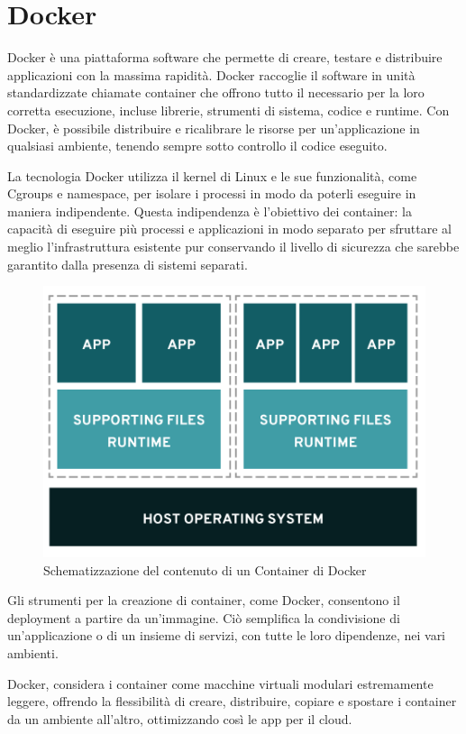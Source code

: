 \section{Docker}
Docker è una piattaforma software che permette di creare, testare e distribuire applicazioni con la massima rapidità. Docker raccoglie 
il software in unità standardizzate chiamate container che offrono tutto il necessario per la loro corretta esecuzione, incluse librerie, 
strumenti di sistema, codice e runtime. Con Docker, è possibile 
distribuire e ricalibrare le risorse per un'applicazione in qualsiasi ambiente, tenendo sempre sotto controllo il codice eseguito.

La tecnologia Docker utilizza il kernel di Linux e le sue funzionalità, come Cgroups e namespace, per isolare i processi in modo da poterli 
eseguire in maniera indipendente. Questa indipendenza è l'obiettivo dei container: la capacità di eseguire più processi e applicazioni in 
modo separato per sfruttare al meglio l'infrastruttura esistente pur conservando il livello di sicurezza che sarebbe garantito dalla 
presenza di sistemi separati.

\begin{figure}
	\centering
	\includegraphics[scale=0.7]{images/Docker_Config_Container.png}
	\caption{Schematizzazione del contenuto di un Container di Docker}
	\label{fig:DCC}
\end{figure}

Gli strumenti per la creazione di container, come Docker, consentono il deployment a partire da un'immagine. Ciò semplifica la 
condivisione di un'applicazione o di un insieme di servizi, con tutte le loro dipendenze, nei vari ambienti.

Docker, considera i container come macchine virtuali modulari estremamente leggere, offrendo la flessibilità di creare, distribuire, 
copiare e spostare i container da un ambiente all'altro, ottimizzando così le app per il cloud.

